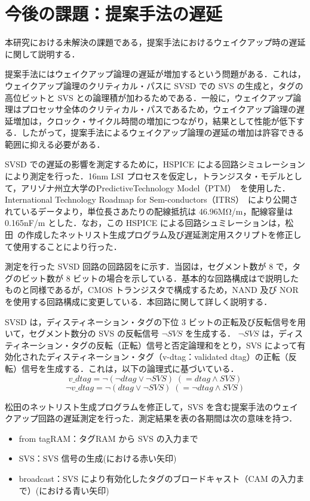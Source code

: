 
\chapter{今後の課題：提案手法の遅延}
\label{sec:appendix2}
本研究における未解決の課題である，提案手法におけるウェイクアップ時の遅延に関して説明する．

提案手法にはウェイクアップ論理の遅延が増加するという問題がある．これは，ウェイクアップ論理のクリティカル・パスに SVSD での SVS の生成と，タグの高位ビットと SVS との論理積が加わるためである．一般に，ウェイクアップ論理はプロセッサ全体のクリティカル・パスであるため，ウェイクアップ論理の遅延増加は，クロック・サイクル時間の増加につながり，結果として性能が低下する．したがって，提案手法によるウェイクアップ論理の遅延の増加は許容できる範囲に抑える必要がある．

SVSD での遅延の影響を測定するために，HSPICE による回路シミュレーションにより測定を行った．16nm LSI プロセスを仮定し，トランジスタ・モデルとして，アリゾナ州立大学のPredictiveTechnology Model（PTM）~\cite{model2012}を使用した．International Technology Roadmap for Sem-conductors（ITRS）~\cite{itrs2012}により公開されているデータより，単位長さあたりの配線抵抗は 46.96MΩ/m，配線容量は 0.165nF/m とした．なお，この HSPICE による回路シュミレーションは，松田~\cite{matsuda-thesis}の作成したネットリスト生成プログラム及び遅延測定用スクリプトを修正して使用することにより行った． 

測定を行った SVSD 回路の回路図をに示す．当図は，セグメント数が 8 で，タグのビット数が 8 ビットの場合を示している．基本的な回路構成はで説明したものと同様であるが，CMOS トランジスタで構成するため，NAND 及び NOR を使用する回路構成に変更している．本回路に関して詳しく説明する．

SVSD は，ディスティネーション・タグの下位 3 ビットの正転及び反転信号を用いて，セグメント数分の SVS の反転信号 $\lnot SVS$ を生成する． $\lnot SVS$ は，ディスティネーション・タグの反転（正転）信号と否定論理和をとり，SVS によって有効化されたディスティネーション・タグ（v-dtag：validated dtag）の正転（反転）信号を生成する．これは，以下の論理式に基づいている．
\[
  v\_dtag = \lnot (\lnot dtag \lor \lnot SVS) \; (= dtag \land SVS) 
\]
\[
  \lnot v\_dtag = \lnot (dtag \lor \lnot SVS) \; (= \lnot dtag \land SVS) 
\]

  松田のネットリスト生成プログラムを修正して，SVS を含む提案手法のウェイクアップ回路の遅延測定を行った．測定結果を表の各期間は次の意味を持つ．
  \begin{itemize}
    \item from tagRAM：タグRAM から SVS  の入力まで
    \item SVS：SVS 信号の生成(における赤い矢印)
    \item broadcast：SVS により有効化したタグのブロードキャスト（CAM の入力まで）(における青い矢印) 
  \end{itemize}

